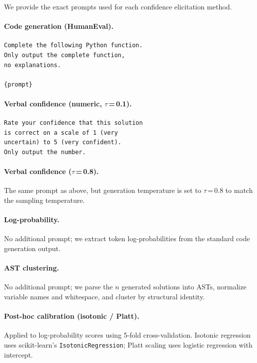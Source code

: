 \documentclass{article}
\begin{document}
We provide the exact prompts used for each confidence elicitation method.

\paragraph{Code generation (HumanEval).}
\begin{verbatim}
Complete the following Python function.
Only output the complete function,
no explanations.

{prompt}
\end{verbatim}

\paragraph{Verbal confidence (numeric, $\tau$\,=\,0.1).}
\begin{verbatim}
Rate your confidence that this solution
is correct on a scale of 1 (very
uncertain) to 5 (very confident).
Only output the number.
\end{verbatim}

\paragraph{Verbal confidence ($\tau$\,=\,0.8).}
The same prompt as above, but generation temperature is set to $\tau$\,=\,0.8 to match the sampling temperature.

\paragraph{Log-probability.}
No additional prompt; we extract token log-probabilities from the standard code generation output.

\paragraph{AST clustering.}
No additional prompt; we parse the $n$ generated solutions into ASTs, normalize variable names and whitespace, and cluster by structural identity.

\paragraph{Post-hoc calibration (isotonic / Platt).}
Applied to log-probability scores using 5-fold cross-validation. Isotonic regression uses scikit-learn's \texttt{IsotonicRegression}; Platt scaling uses logistic regression with intercept.
\end{document}
